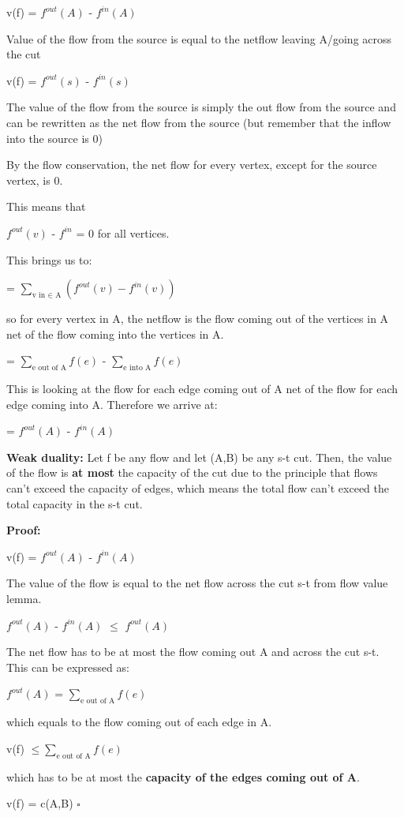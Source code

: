\documentclass[11pt, oneside]{article}
\theoremstyle{definition}
\begin{document}
\begin{center}
  v(f) = $f^{out}(A)$ - $f^{in}(A)$

  Value of the flow from the source is equal to the netflow leaving A/going across the cut

  v(f) = $f^{out}(s)$ - $f^{in}(s)$

  The value of the flow from the source is simply the out flow from the source and can be rewritten as the net flow from the source (but remember that the inflow into the source is 0)

  By the flow conservation, the net flow for every vertex, except for the source vertex, is 0.

  This means that

  $f^{out}(v)$ - $f^{in}$ = 0 for all vertices.

  This brings us to:

  = $\sum_{\text{v in $\in$ A}}(f^{out}(v) - f^{in}(v))$

  so for every vertex in A, the netflow is the flow coming out of the vertices in A net of the flow coming into the vertices in A.

  = $\sum_{\text{e out of A}}f(e)$ - $\sum_{\text{e into A}}f(e)$

  This is looking at the flow for each edge coming out of A net of the flow for each edge coming into A. Therefore we arrive at:

  = $f^{out}(A)$ - $f^{in}(A)$
\end{center}

\textbf{Weak duality:} Let f be any flow and let (A,B) be any s-t cut. Then, the value of the flow is \textbf{at most} the capacity of the cut due to the principle that flows can't exceed the capacity of edges, which means the total flow can't exceed the total capacity in the s-t cut.

\begin{addmargin}[1em]{2em}%
\textbf{Proof: }
\begin{center}
  v(f) = $f^{out}(A)$ - $f^{in}(A)$

  The value of the flow is equal to the net flow across the cut s-t from flow value lemma.

  $f^{out}(A)$ - $f^{in}(A)$ $\leq$ $f^{out}(A)$

  The net flow has to be at most the flow coming out A and across the cut s-t. This can be expressed as:

  $f^{out}(A)$ = $\sum_{\text{e out of A}}f(e)$

  which equals to the flow coming out of each edge in A.

  v(f) $\leq \sum_{\text{e out of A}}f(e)$

  which has to be at most the \textbf{capacity of the edges coming out of A}.

  v(f) = c(A,B) $\square$
\end{center}
\end{addmargin}
\end{document}
